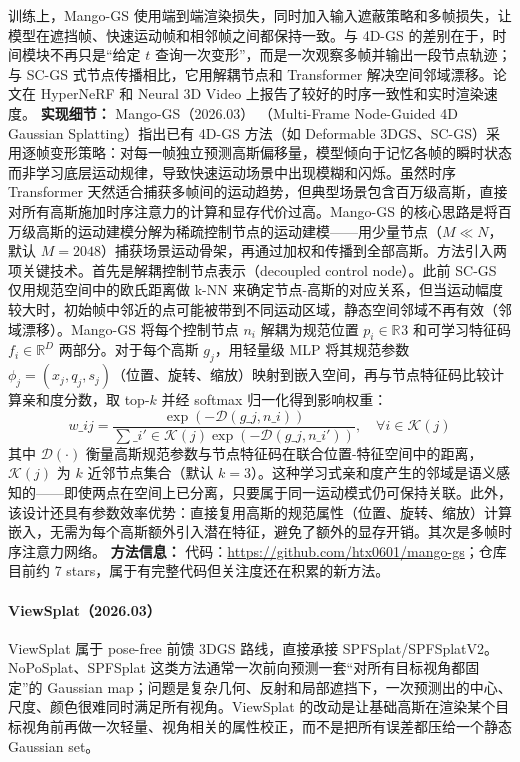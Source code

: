 训练上，Mango-GS 使用端到端渲染损失，同时加入输入遮蔽策略和多帧损失，让模型在遮挡帧、快速运动帧和相邻帧之间都保持一致。与 4D-GS 的差别在于，时间模块不再只是“给定 $t$ 查询一次变形”，而是一次观察多帧并输出一段节点轨迹；与 SC-GS 式节点传播相比，它用解耦节点和 Transformer 解决空间邻域漂移。论文在 HyperNeRF 和 Neural 3D Video 上报告了较好的时序一致性和实时渲染速度。
\textbf{实现细节：} Mango-GS（2026.03） （Multi-Frame Node-Guided 4D Gaussian Splatting）指出已有 4D-GS 方法（如 Deformable 3DGS、SC-GS）采用逐帧变形策略：对每一帧独立预测高斯偏移量，模型倾向于记忆各帧的瞬时状态而非学习底层运动规律，导致快速运动场景中出现模糊和闪烁。虽然时序 Transformer 天然适合捕获多帧间的运动趋势，但典型场景包含百万级高斯，直接对所有高斯施加时序注意力的计算和显存代价过高。Mango-GS 的核心思路是将百万级高斯的运动建模分解为稀疏控制节点的运动建模——用少量节点（$M \ll N$，默认 $M=2048$）捕获场景运动骨架，再通过加权和传播到全部高斯。方法引入两项关键技术。首先是解耦控制节点表示（decoupled control node）。此前 SC-GS 仅用规范空间中的欧氏距离做 k-NN 来确定节点-高斯的对应关系，但当运动幅度较大时，初始帧中邻近的点可能被带到不同运动区域，静态空间邻域不再有效（邻域漂移）。Mango-GS 将每个控制节点 $n_i$ 解耦为规范位置 $p_i \in \mathbb{R}^{}3$ 和可学习特征码 $f_i \in \mathbb{R}^D$ 两部分。对于每个高斯 $g_j$，用轻量级 MLP 将其规范参数 $\phi_j = (x_j, q_j, s_j)$（位置、旋转、缩放）映射到嵌入空间，再与节点特征码比较计算亲和度分数，取 top-$k$ 并经 softmax 归一化得到影响权重： \begin{equation*} w\_{ij} = \frac{\exp(-\mathcal{D}(g\_j, n\_i))}{\sum\_{i' \in \mathcal{K}(j)} \exp(-\mathcal{D}(g\_j, n\_{i'}))}, \quad \forall i \in \mathcal{K}(j) \end{equation*} 其中 $\mathcal{D}(\cdot)$ 衡量高斯规范参数与节点特征码在联合位置-特征空间中的距离，$\mathcal{K}(j)$ 为 $k$ 近邻节点集合（默认 $k=3$）。这种学习式亲和度产生的邻域是语义感知的——即使两点在空间上已分离，只要属于同一运动模式仍可保持关联。此外，该设计还具有参数效率优势：直接复用高斯的规范属性（位置、旋转、缩放）计算嵌入，无需为每个高斯额外引入潜在特征，避免了额外的显存开销。其次是多帧时序注意力网络。
\textbf{方法信息：} 代码：\url{https://github.com/htx0601/mango-gs}；仓库目前约 7 stars，属于有完整代码但关注度还在积累的新方法。



\paragraph{ViewSplat（2026.03）\cite{2603_25265}}
ViewSplat 属于 pose-free 前馈 3DGS 路线，直接承接 SPFSplat/SPFSplatV2。NoPoSplat、SPFSplat 这类方法通常一次前向预测一套“对所有目标视角都固定”的 Gaussian map；问题是复杂几何、反射和局部遮挡下，一次预测出的中心、尺度、颜色很难同时满足所有视角。ViewSplat 的改动是让基础高斯在渲染某个目标视角前再做一次轻量、视角相关的属性校正，而不是把所有误差都压给一个静态 Gaussian set。

